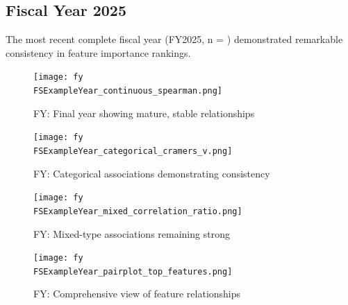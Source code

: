\newpage

\subsection{Fiscal Year 2025}

The most recent complete fiscal year (FY2025, n = \FSRecordsFinalFYTwoThousandTwentyFive) demonstrated remarkable consistency in feature importance rankings.

\vspace*{\fill}
\begin{figure}[htbp]
\centering
\texttt{[image: fy\\FSExampleYear\_continuous\_spearman.png]}
\caption{FY\FSExampleYear: Final year showing mature, stable relationships}
\label{fig:spearman-2025}
\end{figure}
\vspace*{\fill}

\newpage

\vspace*{\fill}
\begin{figure}[htbp]
\centering
\texttt{[image: fy\\FSExampleYear\_categorical\_cramers\_v.png]}
\caption{FY\FSExampleYear: Categorical associations demonstrating consistency}
\label{fig:cramers-2025}
\end{figure}
\vspace*{\fill}

\newpage

\vspace*{\fill}
\begin{figure}[htbp]
\centering
\texttt{[image: fy\\FSExampleYear\_mixed\_correlation\_ratio.png]}
\caption{FY\FSExampleYear: Mixed-type associations remaining strong}
\label{fig:eta-2025}
\end{figure}
\vspace*{\fill}

\newpage

\vspace*{\fill}
\begin{figure}[htbp]
\centering
\texttt{[image: fy\\FSExampleYear\_pairplot\_top\_features.png]}
\caption{FY\FSExampleYear: Comprehensive view of feature relationships}
\label{fig:pairplot-2025}
\end{figure}
\vspace*{\fill}

\newpage

